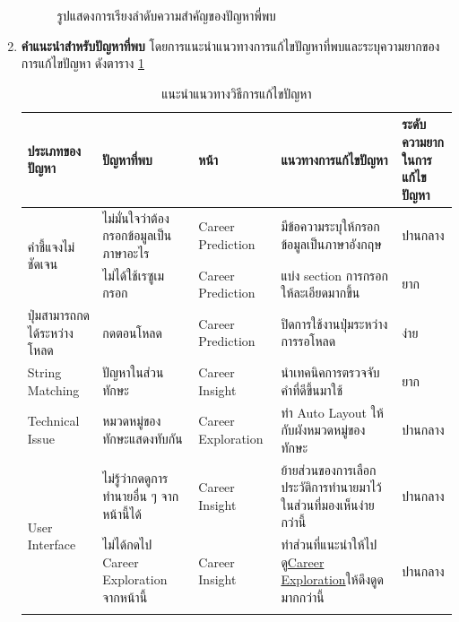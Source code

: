 \begin{enumerate}
\begin{figure}[H]
              \caption{รูปแสดงการเรียงลำดับความสำคัญของปัญหาพี่พบ}\label{fig:PrioritizeUT}
          \end{figure}
    \item \textbf{คำแนะนำสำหรับปัญหาที่พบ} โดยการแนะนำแนวทางการแก้ไขปัญหาที่พบและระบุความยากของการแก้ไขปัญหา ดังตาราง \ref{tab:recommendationsUT}
          \begin{table}[H]
              \caption{แนะนำแนวทางวิธีการแก้ไขปัญหา}
              \label{tab:recommendationsUT}
              \begin{tabularx}{\textwidth}{|l|>{\raggedright\arraybackslash}X|l|>{\raggedright\arraybackslash}X|>{\raggedright\arraybackslash}X|}
                  \hline
                  \textbf{ประเภทของปัญหา}             & \textbf{ปัญหาที่พบ}                    & \textbf{หน้า}       & \textbf{แนวทางการแก้ไขปัญหา}                          & \textbf{ระดับความยากในการแก้ไขปัญหา} \\ \hline
                  \multirow[t]{2}{*}{คำชี้แจงไม่ชัดเจน}   & ไม่มั่นใจว่าต้องกรอกข้อมูลเป็นภาษาอะไร      & Career Prediction  & มีข้อความระบุให้กรอกข้อมูลเป็นภาษาอังกฤษ                    & ปานกลาง                           \\ \cline{2-5}
                                                     & ไม่ได้ใช้เรซูเมกรอก                     & Career Prediction  & แบ่ง section การกรอกให้ละเอียดมากขึ้น                    & ยาก                               \\ \hline
                  ปุ่มสามารถกดได้ระหว่างโหลด             & กดตอนโหลด                           & Career Prediction  & ปิดการใช้งานปุ่มระหว่างการรอโหลด                         & ง่าย                               \\ \hline
                  String Matching                    & ปัญหาในส่วนทักษะ                       & Career Insight     & นำเทคนิคการตรวจจับคำที่ดีขึ้นมาใช้                            & ยาก                               \\ \hline
                  Technical Issue                    & หมวดหมู่ของทักษะแสดงทับกัน               & Career Exploration & ทำ Auto Layout ให้กับผังหมวดหมู่ของทักษะ                   & ปานกลาง                           \\ \hline
                  \multirow[t]{3}{*}{User Interface} & ไม่รู้ว่ากดดูการทำนายอื่น ๆ จากหน้านี้ได้       & Career Insight     & ย้ายส่วนของการเลือกประวัติการทำนายมาไว้ในส่วนที่มองเห็นง่ายกว่านี้ & ปานกลาง                           \\ \cline{2-5}
                                                     & ไม่ได้กดไป Career Exploration จากหน้านี้ & Career Insight     & ทำส่วนที่แนะนำให้ไปดู\hyperref[subsec:Career Exploration]{Career Exploration}ให้ดึงดูดมากกว่านี้                 & ปานกลาง                           \\ \cline{2-5}

\end{tabularx}
\end{table}
\end{enumerate}
